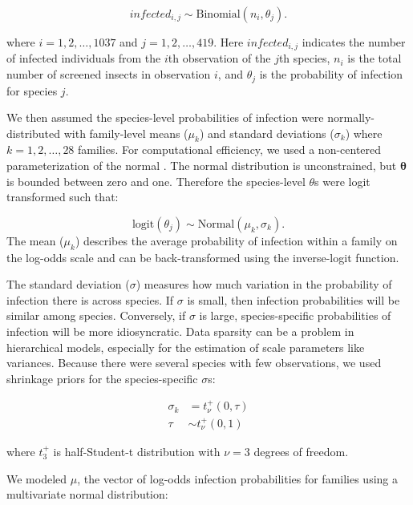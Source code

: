\documentclass{frontiersSCNS}
\begin{document}
\begin{equation}
	infected_{i,j} \sim \mathrm{Binomial}(n_{i}, \theta_{j}).
\end{equation}

where $i = 1, 2, \ldots, 1037$ and $j = 1, 2, \ldots, 419$. Here $infected_{i,j}$ indicates the number of infected individuals from the $i$th observation of the $j$th species,  $n_{i}$ is the total number of screened insects in observation $i$, and $\theta_{j}$ is the probability of infection for species $j$. 

	We then assumed the species-level probabilities of infection were normally-distributed with family-level means ($\mu_{k}$) and standard deviations ($\sigma_{k}$) where $k = 1, 2, \ldots, 28$ families. For computational efficiency, we used a non-centered parameterization of the normal \citep{Papaspiliopoulos:2007aa}. The normal distribution is unconstrained, but $\mathbf{\theta}$ is bounded between zero and one. Therefore the species-level $\theta$s were logit transformed such that:

	\begin{equation}    
		\mathrm{logit} (\theta_{j}) \sim \mathrm{Normal}(\mu_{k}, \sigma_{k}).
	\end{equation}
The mean ($\mu_{k}$) describes the average probability of infection within a family on the log-odds scale and can be back-transformed using the inverse-logit function. 

The standard deviation ($\sigma$) measures how much variation in the probability of infection there is across species. If $\sigma$ is small, then infection probabilities will be similar among species. Conversely, if $\sigma$ is large, species-specific probabilities of infection will be more idiosyncratic. Data sparsity can be a problem in hierarchical models, especially for the estimation of scale parameters like variances. Because there were several species with few observations, we used shrinkage priors \citep{Carvalho:2009aa,Carvalho:2010aa} for the species-specific $\sigma$s: 
	
    \begin{align}
		\sigma_{k} 	&= 	 	t_{\nu}^{+}(0,\tau) \nonumber \\
        \tau		&\sim	t_{\nu}^{+}(0,1)     
	\end{align}
    
where $t_{3}^{+}$ is half-Student-t distribution with $\nu=3$ degrees of freedom. 

We modeled $\mu$, the vector of log-odds infection probabilities for families using a multivariate normal distribution:
\end{document}
